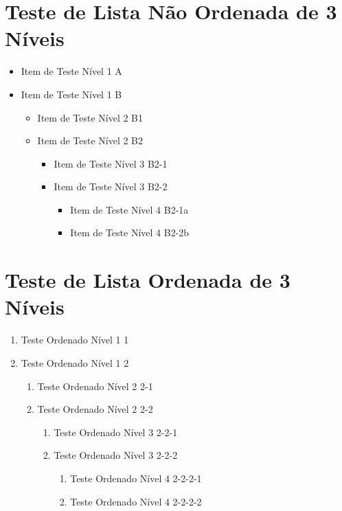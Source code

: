 \documentclass[pt]{../../elegantbook}
\begin{document}
\section{Teste de Lista Não Ordenada de 3 Níveis}
\begin{itemize}
\item Item de Teste Nível 1 A
\item Item de Teste Nível 1 B
    \begin{itemize}
    \item Item de Teste Nível 2 B1
    \item Item de Teste Nível 2 B2
        \begin{itemize}
        \item Item de Teste Nível 3 B2-1
        \item Item de Teste Nível 3 B2-2
            \begin{itemize}
            \item Item de Teste Nível 4 B2-1a
            \item Item de Teste Nível 4 B2-2b
            \end{itemize}
        \end{itemize}
    \end{itemize}
\end{itemize}

\section{Teste de Lista Ordenada de 3 Níveis}
\begin{enumerate}
\item Teste Ordenado Nível 1 1
\item Teste Ordenado Nível 1 2
    \begin{enumerate}
    \item Teste Ordenado Nível 2 2-1
    \item Teste Ordenado Nível 2 2-2
        \begin{enumerate}
        \item Teste Ordenado Nível 3 2-2-1
        \item Teste Ordenado Nível 3 2-2-2
            \begin{enumerate}
            \item Teste Ordenado Nível 4 2-2-2-1
            \item Teste Ordenado Nível 4 2-2-2-2
            \end{enumerate}
        \end{enumerate}
    \end{enumerate}
\end{enumerate}
\end{document}
